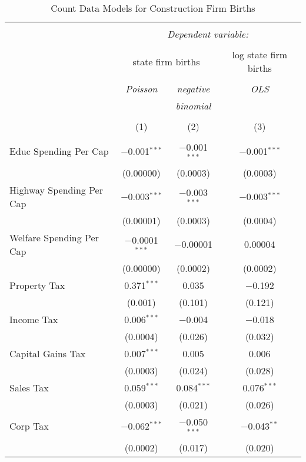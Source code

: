 
\begin{table}[!htbp] \centering 
  \caption{Count Data Models for Construction Firm Births} 
  \label{} 
\begin{tabular}{@{\extracolsep{5pt}}lccc} 
\\[-1.8ex]\hline 
\hline \\[-1.8ex] 
 & \multicolumn{3}{c}{\textit{Dependent variable:}} \\ 
\cline{2-4} 
\\[-1.8ex] & \multicolumn{2}{c}{state firm births} & log state firm births \\ 
\\[-1.8ex] & \textit{Poisson} & \textit{negative} & \textit{OLS} \\ 
 & \textit{} & \textit{binomial} & \textit{} \\ 
\\[-1.8ex] & (1) & (2) & (3)\\ 
\hline \\[-1.8ex] 
 Educ Spending Per Cap & $-$0.001$^{***}$ & $-$0.001$^{***}$ & $-$0.001$^{***}$ \\ 
  & (0.00000) & (0.0003) & (0.0003) \\ 
  Highway Spending Per Cap  & $-$0.003$^{***}$ & $-$0.003$^{***}$ & $-$0.003$^{***}$ \\ 
  & (0.00001) & (0.0003) & (0.0004) \\ 
  Welfare Spending Per Cap  & $-$0.0001$^{***}$ & $-$0.00001 & 0.00004 \\ 
  & (0.00000) & (0.0002) & (0.0002) \\ 
  Property Tax & 0.371$^{***}$ & 0.035 & $-$0.192 \\ 
  & (0.001) & (0.101) & (0.121) \\ 
  Income Tax & 0.006$^{***}$ & $-$0.004 & $-$0.018 \\ 
  & (0.0004) & (0.026) & (0.032) \\ 
  Capital Gains Tax & 0.007$^{***}$ & 0.005 & 0.006 \\ 
  & (0.0003) & (0.024) & (0.028) \\ 
  Sales Tax & 0.059$^{***}$ & 0.084$^{***}$ & 0.076$^{***}$ \\ 
  & (0.0003) & (0.021) & (0.026) \\ 
  Corp Tax & $-$0.062$^{***}$ & $-$0.050$^{***}$ & $-$0.043$^{**}$ \\ 
  & (0.0002) & (0.017) & (0.020) \\ 

\end{tabular}
\end{table}
